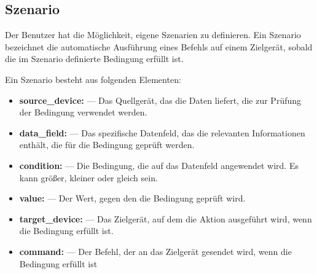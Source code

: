 \documentclass[12pt, letterpaper]{article}
\begin{document}
  \subsection{Szenario}
  \par Der Benutzer hat die Möglichkeit, eigene Szenarien zu definieren. Ein Szenario bezeichnet die automatische Ausführung eines Befehls auf einem Zielgerät, sobald die im Szenario definierte Bedingung erfüllt ist.
  \par Ein Szenario besteht aus folgenden Elementen:
  \begin{itemize}
    \item \textbf{source\_device:} --- Das Quellgerät, das die Daten liefert, die zur Prüfung der Bedingung verwendet werden.
    \item \textbf{data\_field:} --- Das spezifische Datenfeld, das die relevanten Informationen enthält, die für die Bedingung geprüft werden.
    \item \textbf{condition:} --- Die Bedingung, die auf das Datenfeld angewendet wird. Es kann größer, kleiner oder gleich sein.
    \item \textbf{value:} --- Der Wert, gegen den die Bedingung geprüft wird.
    \item \textbf{target\_device:} --- Das Zielgerät, auf dem die Aktion ausgeführt wird, wenn die Bedingung erfüllt ist.
    \item \textbf{command:} --- Der Befehl, der an das Zielgerät gesendet wird, wenn die Bedingung erfüllt ist
  \end{itemize}
\end{document}
